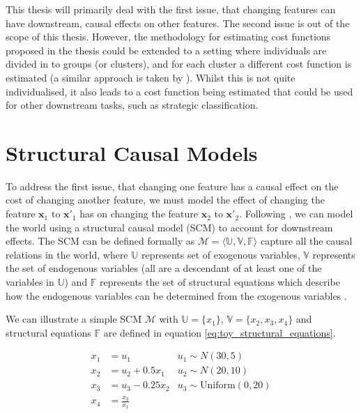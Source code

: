 This thesis will primarily deal with the first issue, that changing features can have downstream, causal effects on other features. The second issue is out of the scope of this thesis. However, the methodology for estimating cost functions proposed in the thesis could be extended to a setting where individuals are divided in to groups (or clusters), and for each cluster a different cost function is estimated (a similar approach is taken by \textcite{bechavodInformationDiscrepancyStrategic2022}). Whilst this is not quite individualised, it also leads to a cost function being estimated that could be used for other downstream tasks, such as strategic classification.

\section{Structural Causal Models}

To address the first issue, that changing one feature has a causal effect on the cost of changing another feature, we must model the effect of changing the feature $\boldsymbol{x}_1$ to $\mathbf{x'}_1$ has on changing the feature $\boldsymbol{x}_2$ to $\mathbf{x'}_2$. Following \textcite{karimiAlgorithmicRecourseCounterfactual2021}, we can model the world using a structural causal model (SCM) to account for downstream effects. The SCM can be defined formally as $\mathcal{M} = \langle\mathbb{U, V, F}\rangle$ capture all the causal relations in the world, where $\mathbb{U}$ represents set of exogenous variables, $\mathbb{V}$ represents the set of endogenous variables (all are a descendant of at least one of the variables in $\mathbb{U}$) and $\mathbb{F}$ represents the set of structural equations which describe how the endogenous variables can be determined from the exogenous variables \citep{pearl2016causal}.

We can illustrate a simple SCM $\mathcal{M}$ with $\mathbb{U} = \{x_1\}$, $\mathbb{V} = \{x_2, x_3, x_4\}$ and structural equations $\mathbb{F}$ are defined in equation \ref{eq:toy_structural_equations}.

\begin{align} \label{eq:toy_structural_equations}
	x_1 & = u_1 & u_1 \sim N(30 , 5) \\ \nonumber %
	x_2 & = u_2 + 0.5x_1 & u_2 \sim N(20, 10) \\ \nonumber %
	x_3 & = u_3 - 0.25x_2 & u_3 \sim \text{Uniform}(0, 20) \\ \nonumber %
	x_4 & = \frac{x_3}{x_1} %
\end{align}


